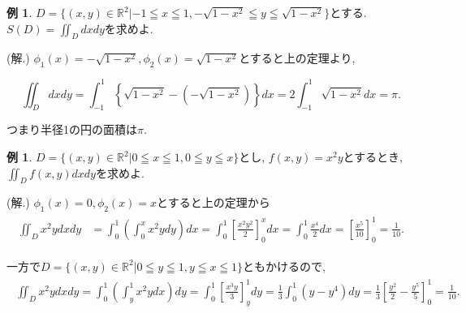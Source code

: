 \documentclass[dvipdfmx,a4paper,11pt]{article}
\newcommand{\R}{\mathbb{R}}
\newcommand{\Area}{S}
\theoremstyle{definition}
\newtheorem{exa}[thm]{例}
\begin{document}
   \begin{exa}
$D = \{ (x,y) \in \R^2 | -1 \leqq x \leqq 1, -\sqrt{1-x^2} \leqq y \leqq \sqrt{1-x^2} \}$とする.
$\Area(D) = \iint_{D} dxdy$を求めよ.

\hspace{-11pt}(解.) $\phi_1(x)=-\sqrt{1-x^2}, \phi_2(x)=\sqrt{1-x^2} $とすると上の定理より, 

$$
  \iint_{D}dxdy =\int_{-1}^{1} \left\{ \sqrt{1-x^2} - \left(-\sqrt{1-x^2} \right) \right\} dx
  = 2 \int_{-1}^{1} \sqrt{1-x^2} dx =\pi.
$$
  \end{exa}
つまり半径1の円の面積は$\pi$.

    \begin{exa}
$D = \{ (x,y) \in \R^2 | 0 \leqq x \leqq 1, 0 \leqq y \leqq x  \}$とし, 
$f(x,y)=x^2y$とするとき,  $\iint_{D}f(x,y)dxdy$を求めよ.

\hspace{-11pt}(解.) 
$\phi_1 (x)=0, \phi_2(x)=x$とすると上の定理から
\begin{align*}
\begin{split}
\iint_{D} x^2ydxdy &= \int_{0}^{1} \left( \int_{0}^{x} x^2 y dy\right) dx
= \int_{0}^{1}\left[  \frac{x^2y^2}{2}\right]_{0}^{x} dx
=  \int_{0}^{1}    \frac{x^4 }{2}      dx
= \left[  \frac{x^5}{10}   \right]_{0}^{1} = \frac{1}{10}.
\end{split}
\end{align*}

一方で$D = \{ (x,y) \in \R^2 | 0 \leqq y \leqq 1, y \leqq x  \leqq 1\}$ともかけるので, 
\begin{align*}
\begin{split}
\iint_{D} x^2ydxdy 
= \int_{0}^{1} \left( \int_{y}^{1} x^2 y dx\right) dy 
= \int_{0}^{1}\left[  \frac{x^3y}{3}\right]_{y}^{1} dy
=  \frac{1}{3}\int_{0}^{1}  (y - y^4)      dy
= \frac{1}{3}\left[  \frac{y^2}{2} - \frac{y^5}{5}   \right]_{0}^{1} = \frac{1}{10}.
\end{split}
\end{align*}
  \end{exa}
   
\end{document}
